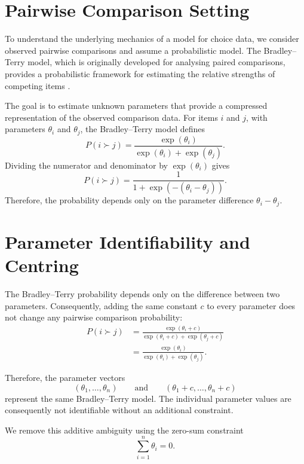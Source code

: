 \documentclass[12pt,oneside]{report}
\begin{document}
\section{Pairwise Comparison Setting}
To understand the underlying mechanics of a model for choice data, we
consider observed pairwise comparisons and assume a probabilistic model.
The Bradley--Terry model, which is originally developed for analysing
paired comparisons, provides a probabilistic framework for
estimating the relative strengths of competing items
\citep{bradleyterry1952}.

The goal is to estimate unknown parameters that provide a compressed
representation of the observed comparison data.
For items \(i\) and \(j\), with parameters \(\theta_i\) and \(\theta_j\), the
Bradley--Terry model defines
\begin{equation}
    P(i\succ j)
    =
    \frac{\exp(\theta_i)}
    {\exp(\theta_i)+\exp(\theta_j)}.
    \label{eq:bradley-terry}
\end{equation}
Dividing the numerator and denominator by \(\exp(\theta_i)\) gives
\begin{equation}
    P(i\succ j)
    =
    \frac{1}
    {1+\exp\left(-(\theta_i-\theta_j)\right)}.
\end{equation}
Therefore, the probability depends only on the parameter difference
\(\theta_i-\theta_j\).

\section{Parameter Identifiability and Centring}

The Bradley--Terry probability depends only on the difference between
two parameters. Consequently, adding the same constant \(c\) to every
parameter does not change any pairwise comparison probability:
\begin{align*}
    P(i\succ j)
    &=
    \frac{\exp(\theta_i+c)}
    {\exp(\theta_i+c)+\exp(\theta_j+c)}
    \\
    &=
    \frac{\exp(\theta_i)}
    {\exp(\theta_i)+\exp(\theta_j)}.
\end{align*}

Therefore, the parameter vectors
\[
(\theta_1,\ldots,\theta_n)
\qquad\text{and}\qquad
(\theta_1+c,\ldots,\theta_n+c)
\]
represent the same Bradley--Terry model. The individual parameter
values are consequently not identifiable without an additional
constraint.

We remove this additive ambiguity using the zero-sum constraint
\begin{equation}
    \sum_{i=1}^{n}\theta_i=0.
    \label{eq:btl-zero-sum}
\end{equation}
\end{document}
